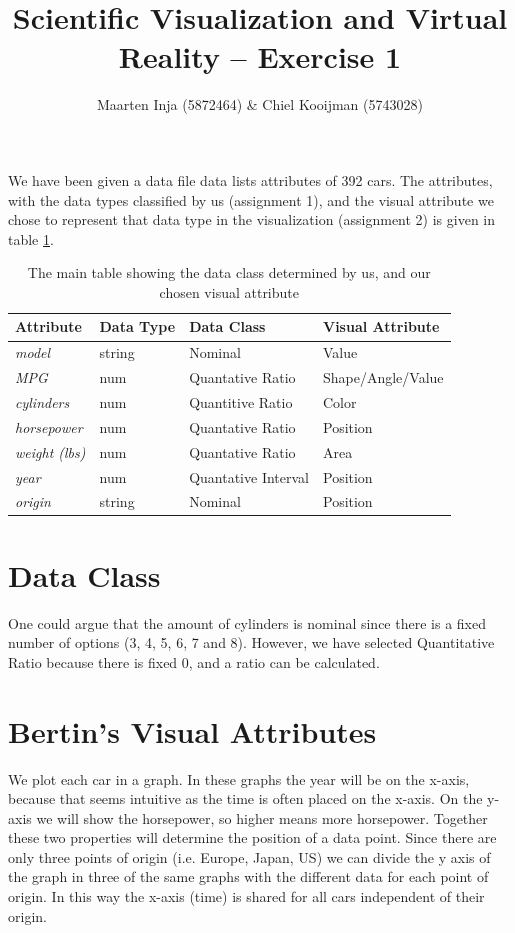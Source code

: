 \documentclass{article}[10pt]
\title{Scientific Visualization and Virtual Reality – Exercise 1}
\author{Maarten Inja (5872464) \& Chiel Kooijman (5743028)}
\begin{document}
\maketitle

We have been given a data file data lists attributes of 392 cars. The
attributes, with the data types classified by us (assignment 1), and the visual
attribute we chose to represent that data type in the visualization (assignment
2) is given in table \ref{tab:mainTable}.

\begin{table}
    \begin{tabular}{l l | l l}
    \textbf{Attribute} & \textbf{Data Type} & \textbf{Data Class} & \textbf{Visual Attribute}\\
    \hline
    \textit{model} & string & Nominal       &  Value \\
    \textit{MPG} & num & Quantative Ratio   & Shape/Angle/Value \\
    \textit{cylinders} & num & Quantitive Ratio & Color \\
    \textit{horsepower} & num & Quantative Ratio & Position\\
    \textit{weight (lbs)} & num & Quantative Ratio & Area \\
    \textit{year} & num & Quantative Interval & Position \\
    \textit{origin} & string & Nominal & Position
    \end{tabular}
\caption{The main table showing the data class determined by us, and our chosen
visual attribute}
\label{tab:mainTable}
\end{table}

\section{Data Class}
One could argue that the amount of cylinders is
nominal since there is a fixed number of options (3, 4, 5, 6, 7 and 8). However,
we have selected Quantitative Ratio because there is fixed 0, and a ratio can be
calculated.

\section{Bertin's Visual Attributes}

We plot each car in a graph.
In these graphs the year will be on the x-axis, because that seems intuitive as the time
is often placed on the x-axis. On the y-axis we will show the horsepower, so
higher means more horsepower.
Together these two properties will determine the position of a data point.
Since there are only three points of origin (i.e. Europe, Japan, US) we can
divide the y axis of the graph in three of the same graphs with the different
data for each point of origin. In this way the x-axis (time) is shared for all
cars independent of their origin.
\end{document}
